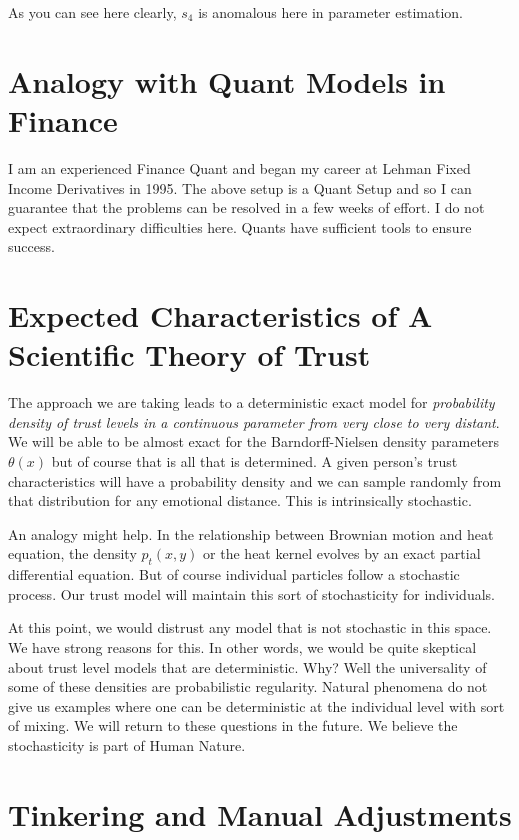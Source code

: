 \documentclass{amsart}
\begin{document}
As you can see here clearly, $s_4$ is anomalous here in parameter estimation.

\section{Analogy with Quant Models in Finance}

I am an experienced Finance Quant and began my career at Lehman Fixed Income Derivatives in 1995.  The above setup is a Quant Setup and so I can guarantee that the problems can be resolved in a few weeks of effort.  I do not expect extraordinary difficulties here.  Quants have sufficient tools to ensure success.

\section{Expected Characteristics of A Scientific Theory of Trust}

The approach we are taking leads to a deterministic exact model for {\em probability density of trust levels in a continuous parameter from very close to very distant}.  We will be able to be almost exact for the Barndorff-Nielsen density parameters $\theta(x)$ but of course that is all that is determined.  A given person's trust characteristics will have a probability density and we can sample randomly from that distribution for any emotional distance.  This is intrinsically stochastic.

An analogy might help.  In the relationship between Brownian motion and heat equation, the density $p_t(x,y)$ or the heat kernel evolves by an exact partial differential equation.  But of course individual particles follow a stochastic process.  Our trust model will maintain this sort of stochasticity for individuals.  

At this point, we would distrust any model that is not stochastic in this space.  We have strong reasons for this.  In other words, we would be quite skeptical about trust level models that are deterministic.  Why?  Well the universality of some of these densities are probabilistic regularity.  Natural phenomena do not give us examples where one can be deterministic at the individual level with sort of mixing.  We will return to these questions in the future.  We believe the stochasticity is part of Human Nature.

\section{Tinkering and Manual Adjustments}
\end{document}
